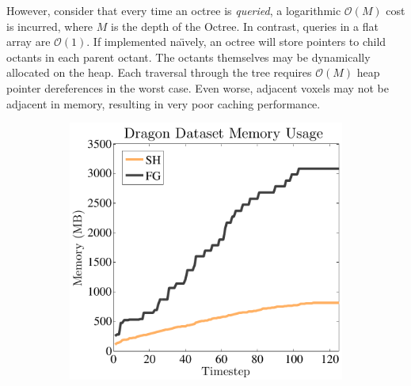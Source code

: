 \documentclass[10pt,twocolumn,letterpaper]{article}
\begin{document}
However, consider that every time an octree is \emph{queried},  a
logarithmic $\mathcal{O}(M)$ cost is incurred, where $M$ is the depth of the
Octree. In contrast, queries in a flat array are $\mathcal{O}(1)$.  If implemented na\"{\i}vely, an
octree will store pointers to child octants in each parent octant. The octants
themselves may be dynamically allocated on the heap. Each traversal through the
tree requires $\mathcal{O}(M)$ heap pointer dereferences in the worst case.
Even worse, adjacent voxels may not be adjacent in memory, resulting in very
poor caching performance.

\begin{figure}
  \centering
    \begin{minipage}{0.25\linewidth}
	 \begin{subfigure}{1.0\linewidth} \centering
			\includegraphics[width=1.0\textwidth]{img/memoryusage.pdf}
			 \caption{} 
			 \label{fig:memory_data}
		 \end{subfigure}  
		  \begin{subfigure}{1.0\linewidth} \centering

\end{subfigure}
\end{minipage}
\end{figure}
\end{document}
